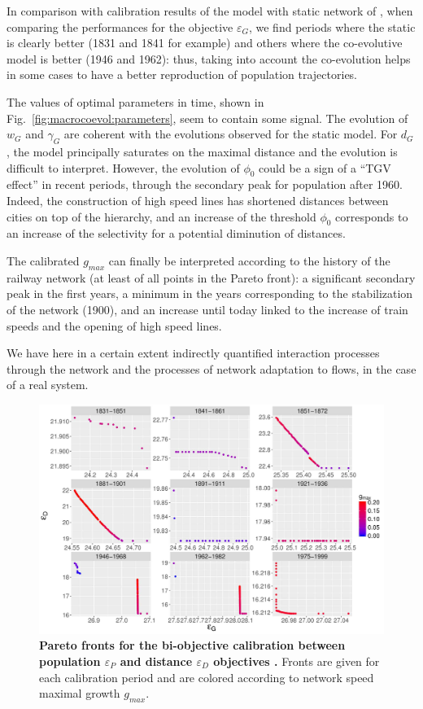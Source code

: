 \documentclass[11pt]{article}
\begin{document}
In comparison with calibration results of the model with static network of \cite{raimbault2018indirect}, when comparing the performances for the objective $\varepsilon_G$, we find periods where the static is clearly better (1831 and 1841 for example) and others where the co-evolutive model is better (1946 and 1962): thus, taking into account the co-evolution helps in some cases to have a better reproduction of population trajectories.


The values of optimal parameters in time, shown in Fig.~\ref{fig:macrocoevol:parameters}, seem to contain some signal. The evolution of $w_G$ and $\gamma_G$ are coherent with the evolutions observed for the static model. For $d_G$, the model principally saturates on the maximal distance and the evolution is difficult to interpret. However, the evolution of $\phi_0$ could be a sign of a ``TGV effect'' in recent periods, through the secondary peak for population after 1960. Indeed, the construction of high speed lines has shortened distances between cities on top of the hierarchy, and an increase of the threshold $\phi_0$ corresponds to an increase of the selectivity for a potential diminution of distances.


The calibrated $g_{max}$ can finally be interpreted according to the history of the railway network (at least of all points in the Pareto front): a significant secondary peak in the first years, a minimum in the years corresponding to the stabilization of the network (1900), and an increase until today linked to the increase of train speeds and the opening of high speed lines. 


We have here in a certain extent indirectly quantified interaction processes through the network and the processes of network adaptation to flows, in the case of a real system.


\begin{figure}
	\includegraphics[width=\linewidth]{figures/Fig6.jpg}
	\caption[Pareto fronts for the calibration on population and distance]{\textbf{Pareto fronts for the bi-objective calibration between population $\varepsilon_P$ and distance $\varepsilon_D$ objectives .} Fronts are given for each calibration period and are colored according to network speed maximal growth $g_{max}$.\label{fig:macrocoevol:pareto}}
\end{figure}
\end{document}
